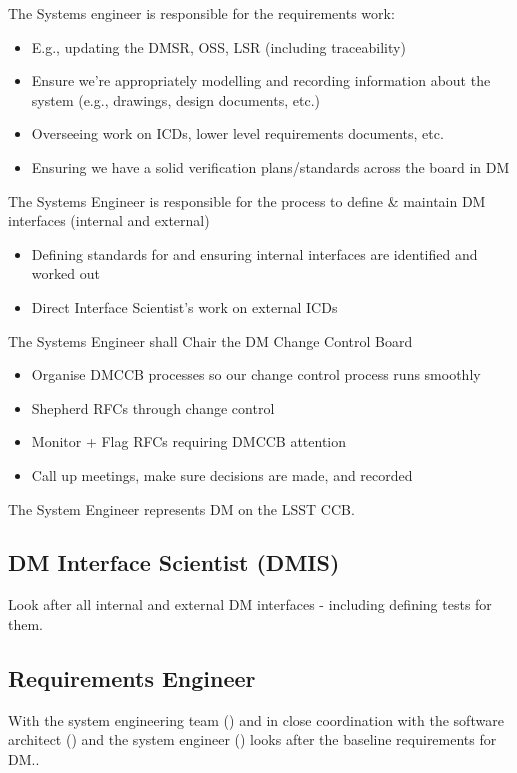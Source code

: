 The Systems engineer  is responsible for the requirements work:
\begin{itemize}
\item E.g., updating the DMSR, OSS, LSR (including traceability)
\item Ensure we’re appropriately modelling and recording information about the system (e.g.,
    drawings, design documents, etc.)
\item Overseeing work on ICDs, lower level requirements documents, etc.
\item Ensuring we have a solid verification plans/standards across the board in DM
\end{itemize}

The Systems Engineer is responsible for the process to define \& maintain DM interfaces (internal and external) 
\begin{itemize}
\item Defining standards for and ensuring internal interfaces are identified and worked out
\item Direct Interface Scientist's work on external ICDs
\end{itemize}

The Systems Engineer shall Chair the DM Change Control Board 
\begin{itemize}
\item Organise DMCCB  processes so our change control process runs smoothly
\item Shepherd RFCs through change control
\item Monitor + Flag RFCs requiring DMCCB  attention
\item Call up meetings, make sure decisions are made, and recorded
\end{itemize}

The System Engineer represents DM on the LSST CCB.

\subsection{DM Interface Scientist (DMIS) \label{role:dmis}}
Look after all internal and external DM interfaces - including defining tests for them. 

\subsection{Requirements Engineer \label{role:reqeng}}
With the system engineering team () and in close coordination with the software architect () and the system engineer () looks after the baseline requirements for DM.. 




